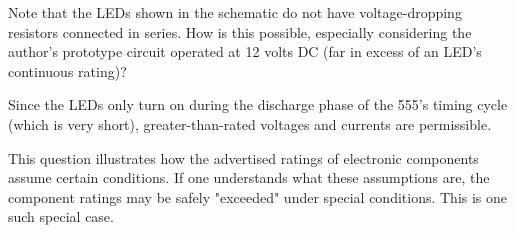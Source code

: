 

Note that the LEDs shown in the schematic do not have voltage-dropping resistors connected in series.  How is this possible, especially considering the author's prototype circuit operated at 12 volts DC (far in excess of an LED's continuous rating)?







Since the LEDs only turn on during the discharge phase of the 555's timing cycle (which is very short), greater-than-rated voltages and currents are permissible.







This question illustrates how the advertised ratings of electronic components assume certain conditions.  If one understands what these assumptions are, the component ratings may be safely "exceeded" under special conditions.  This is one such special case.



